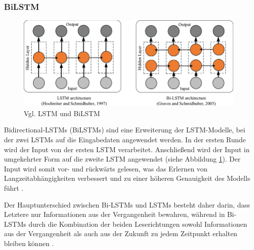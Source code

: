 \subsubsection{BiLSTM}

\begin{figure}[htbp]
    \begin{center}
        \includegraphics[scale=0.4]{static/lstmvsbilstm.png}
        \caption{\label{fig:lstmvsbilstm} Vgl. LSTM und BiLSTM \cite{shen2021}}
    \end{center}
\end{figure}

Bidirectional-LSTMs (BiLSTMs) sind eine Erweiterung der LSTM-Modelle, bei der zwei LSTMs auf die Eingabedaten angewendet werden. 
In der ersten Runde wird der Input von der ersten LSTM verarbeitet. Anschließend wird der Input in umgekehrter Form auf die zweite LSTM
angewendet (siehe Abbildung \ref{fig:lstmvsbilstm}). Der Input wird somit vor- und rückwärts gelesen, was das Erlernen von 
Langzeitabhängigkeiten verbessert und zu einer höheren Genauigkeit des Modells führt \cite{siaminamini2019}. 

Der Hauptunterschied zwischen Bi-LSTMs und LSTMs besteht daher darin, dass Letztere nur 
Informationen aus der Vergangenheit bewahren, während in Bi-LSTMs durch die Kombination der beiden Leserichtungen sowohl Informationen 
aus der Vergangenheit als auch aus der Zukunft zu jedem Zeitpunkt erhalten bleiben können \cite{shen2021}.